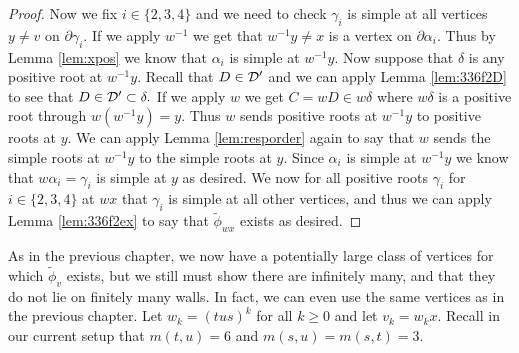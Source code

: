 \documentclass[class=book, crop=false]{standalone}
\begin{document}
\begin{proof}
Now we fix $i\in \{2,3,4\}$ and we need to check $\gamma_i$ is simple at all vertices $y\neq v$ on $\partial\gamma_i.$ If we apply $w^{-1}$ we get that $w^{-1}y\neq x$ is a vertex on $\partial \alpha_i.$ Thus by Lemma \ref{lem:xpos} we know that $\alpha_i$ is simple at $w^{-1}y.$ Now suppose that $\delta$ is any positive root at $w^{-1}y.$ Recall that $D\in \mathcal{D}'$ and we can apply Lemma \ref{lem:336f2D} to see that $D\in \mathcal{D}'\subset \delta.$ If we apply $w$ we get $C=wD\in w\delta$ where $w\delta$ is a positive root through $w(w^{-1}y)=y.$ Thus $w$ sends positive roots at $w^{-1}y$ to positive roots at $y.$ We can apply Lemma \ref{lem:resporder} again to say that $w$ sends the simple roots at $w^{-1}y$ to the simple roots at $y.$ Since $\alpha_i$ is simple at $w^{-1}y$ we know that $w\alpha_i=\gamma_i$ is simple at $y$ as desired. We now for all positive roots $\gamma_i$ for $i\in \{2,3,4\}$ at $wx$ that $\gamma_i$ is simple at all other vertices, and thus we can apply Lemma \ref{lem:336f2ex} to say that $\tilde{\phi}_{wx}$ exists as desired.


\end{proof}

As in the previous chapter, we now have a potentially large class of vertices for which $\tilde{\phi}_v$ exists, but we still must show there are infinitely many, and that they do not lie on finitely many walls. In fact, we can even use the same vertices as in the previous chapter. Let $w_k=(tus)^k$ for all $k\ge 0$ and let $v_k=w_kx.$ Recall in our current setup that $m(t,u)=6$ and $m(s,u)=m(s,t)=3.$ 
\end{document}
